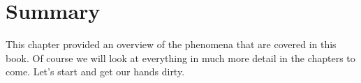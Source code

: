 \section{Summary}

This chapter provided an overview of the phenomena that are covered in this book. Of course we will
look at everything in much more detail in the chapters to come. Let's start and get our hands dirty.






